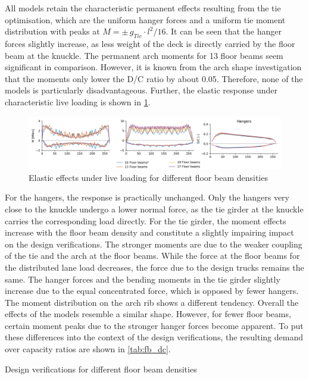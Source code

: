 All models retain the characteristic permanent effects resulting from the tie optimisation, which are the uniform hanger forces and a uniform tie moment distribution with peaks at $M=\pm\,g_{Tie} \cdot l^2 / 16$. It can be seen that the hanger forces slightly increase, as less weight of the deck is directly carried by the floor beam at the knuckle.
The permanent arch moments for 13 floor beams seem significant in comparison. However, it is known from the arch shape investigation that the moments only lower the D/C ratio by about 0.05. Therefore, none of the models is particularly disadvantageous. Further, the elastic response under characteristic live loading is shown in \cref{fig:fb_live}. 

\begin{figure}[H]
    \centering
    \includegraphics[trim={0 0 1cm 0},clip, width=\textwidth]{calculations/floor beam density/live loading_plot.png}
    \caption{Elastic effects under live loading for different floor beam densities}
    \label{fig:fb_live}
\end{figure}

For the hangers, the response is practically unchanged. Only the hangers very close to the knuckle undergo a lower normal force, as the tie girder at the knuckle carries the corresponding load directly. For the tie girder, the moment effects increase with the floor beam density and constitute a slightly impairing impact on the design verifications. The stronger moments are due to the weaker coupling of the tie and the arch at the floor beams. While the force at the floor beams for the distributed lane load decreases, the force due to the design trucks remains the same. The hanger forces and the bending moments in the tie girder slightly increase due to the equal concentrated force, which is opposed by fewer hangers. The moment distribution on the arch rib shows a different tendency. Overall the effects of the models resemble a similar shape. However, for fewer floor beams, certain moment peaks due to the stronger hanger forces become apparent. To put these differences into the context of the design verifications, the resulting demand over capacity ratios are shown in \cref{tab:fb_dc}.

\begin{table}[H]
    \centering
    \resizebox{0.9\columnwidth}{!}{%
    
    }
    \caption{Design verifications for different floor beam densities}
    \label{tab:fb_dc}
\end{table}

